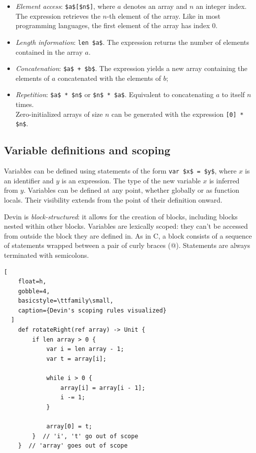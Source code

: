 \documentclass[UdineBachThesis,american,11pt]{PhdThesis}
\begin{document}
  \begin{itemize}
    \item \emph{Element access}: \lstinline[mathescape]@$a$[$n$]@, where $a$
    denotes an array and $n$ an integer index. The expression retrieves the
    $n$-th element of the array. Like in most programming languages, the first
    element of the array has index $0$.

    \item \emph{Length information}: \lstinline[mathescape]@len $a$@. The
    expression returns the number of elements contained in the array $a$.

    \item \emph{Concatenation}: \lstinline[mathescape]@$a$ + $b$@. The
    expression yields a new array containing the elements of $a$ concatenated
    with the elements of $b$;

    \item \emph{Repetition}: \lstinline[mathescape]@$a$ * $n$@ or
    \lstinline[mathescape]@$n$ * $a$@. Equivalent to concatenating $a$ to itself
    $n$ times. \\
    Zero-initialized arrays of size $n$ can be generated with the expression
    \lstinline[mathescape]@[0] * $n$@.
  \end{itemize}

  \subsection{Variable definitions and scoping}

  Variables can be defined using statements of the form
  \lstinline[mathescape]@var $x$ = $y$@, where $x$ is an identifier and $y$ is
  an expression. The type of the new variable $x$ is inferred from $y$.
  Variables can be defined at any point, whether globally or as function locals.
  Their visibility extends from the point of their definition onward.

  Devin is \emph{block-structured}: it allows for the creation of blocks,
  including blocks nested within other blocks. Variables are lexically scoped:
  they can't be accessed from outside the block they are defined in. As in C, a
  block consists of a sequence of statements wrapped between a pair of curly
  braces (@). Statements are always terminated with
  semicolons.

  \begin{lstlisting}[
    float=h,
    gobble=4,
    basicstyle=\ttfamily\small,
    caption={Devin's scoping rules visualized}
  ]
    def rotateRight(ref array) -> Unit {
        if len array > 0 {
            var i = len array - 1;
            var t = array[i];

            while i > 0 {
                array[i] = array[i - 1];
                i -= 1;
            }

            array[0] = t;
        }  // 'i', 't' go out of scope
    }  // 'array' goes out of scope
  \end{lstlisting}
\end{document}
